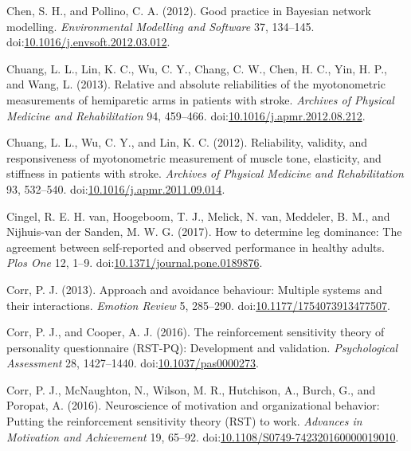 \documentclass[
  english,
  man]{apa6}
\newlength{\cslhangindent}
\newenvironment{cslreferences}%
  {\setlength{\parindent}{0pt}%
  \everypar{\setlength{\hangindent}{\cslhangindent}}\ignorespaces}%
  {\par}
\begin{document}
\begin{cslreferences}
\leavevmode\hypertarget{ref-Chen2012}{}%
Chen, S. H., and Pollino, C. A. (2012). Good practice in Bayesian network modelling. \emph{Environmental Modelling and Software} 37, 134--145. doi:\href{https://doi.org/10.1016/j.envsoft.2012.03.012}{10.1016/j.envsoft.2012.03.012}.

\leavevmode\hypertarget{ref-Chuang2013}{}%
Chuang, L. L., Lin, K. C., Wu, C. Y., Chang, C. W., Chen, H. C., Yin, H. P., and Wang, L. (2013). Relative and absolute reliabilities of the myotonometric measurements of hemiparetic arms in patients with stroke. \emph{Archives of Physical Medicine and Rehabilitation} 94, 459--466. doi:\href{https://doi.org/10.1016/j.apmr.2012.08.212}{10.1016/j.apmr.2012.08.212}.

\leavevmode\hypertarget{ref-Chuang2012}{}%
Chuang, L. L., Wu, C. Y., and Lin, K. C. (2012). Reliability, validity, and responsiveness of myotonometric measurement of muscle tone, elasticity, and stiffness in patients with stroke. \emph{Archives of Physical Medicine and Rehabilitation} 93, 532--540. doi:\href{https://doi.org/10.1016/j.apmr.2011.09.014}{10.1016/j.apmr.2011.09.014}.

\leavevmode\hypertarget{ref-VanCingel2017}{}%
Cingel, R. E. H. van, Hoogeboom, T. J., Melick, N. van, Meddeler, B. M., and Nijhuis-van der Sanden, M. W. G. (2017). How to determine leg dominance: The agreement between self-reported and observed performance in healthy adults. \emph{Plos One} 12, 1--9. doi:\href{https://doi.org/10.1371/journal.pone.0189876}{10.1371/journal.pone.0189876}.

\leavevmode\hypertarget{ref-Corr2013}{}%
Corr, P. J. (2013). Approach and avoidance behaviour: Multiple systems and their interactions. \emph{Emotion Review} 5, 285--290. doi:\href{https://doi.org/10.1177/1754073913477507}{10.1177/1754073913477507}.

\leavevmode\hypertarget{ref-Corr2016c}{}%
Corr, P. J., and Cooper, A. J. (2016). The reinforcement sensitivity theory of personality questionnaire (RST-PQ): Development and validation. \emph{Psychological Assessment} 28, 1427--1440. doi:\href{https://doi.org/10.1037/pas0000273}{10.1037/pas0000273}.

\leavevmode\hypertarget{ref-Corr2016b}{}%
Corr, P. J., McNaughton, N., Wilson, M. R., Hutchison, A., Burch, G., and Poropat, A. (2016). Neuroscience of motivation and organizational behavior: Putting the reinforcement sensitivity theory (RST) to work. \emph{Advances in Motivation and Achievement} 19, 65--92. doi:\href{https://doi.org/10.1108/S0749-742320160000019010}{10.1108/S0749-742320160000019010}.


\end{cslreferences}
\end{document}
